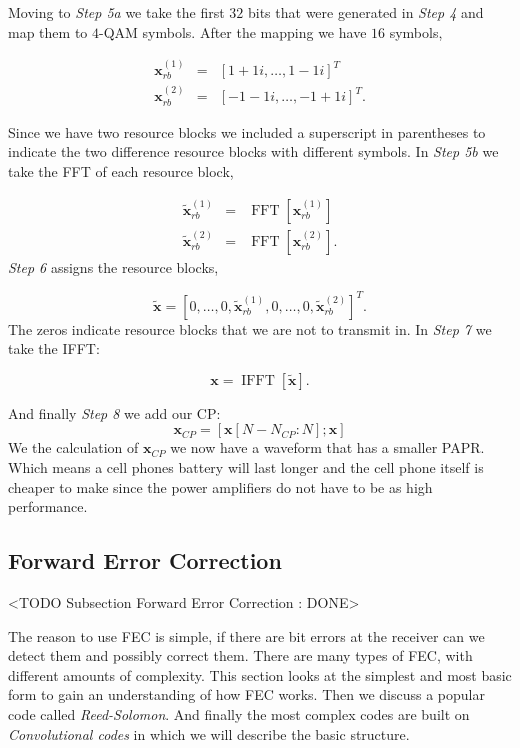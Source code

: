 Moving to \emph{Step 5a} we take the first $32$ bits that were generated in \emph{Step 4} and map them to $4$-\ac{QAM} symbols. After the mapping we have $16$ symbols,

\begin{eqnarray}
\mathbf{x}_{rb}^{(1)}&=&[1+1i,\dots,1-1i]^T\\
\mathbf{x}_{rb}^{(2)}&=&[-1-1i,\dots,-1+1i]^T.
\end{eqnarray}
\noindent

Since we have two resource blocks we included a superscript in parentheses to indicate the two difference resource blocks with different symbols. In \emph{Step 5b} we take the \ac{FFT} of each resource block,

\begin{eqnarray}
\tilde{\mathbf{x}}_{rb}^{(1)}&=&\operatorname{FFT}\left[\mathbf{x}_{rb}^{(1)}\right]\\
\tilde{\mathbf{x}}_{rb}^{(2)}&=&\operatorname{FFT}\left[\mathbf{x}_{rb}^{(2)}\right].
\end{eqnarray} 
\noindent
\emph{Step 6} assigns the resource blocks,

\begin{equation}
\tilde{\mathbf{x}}=[0,\dots,0,\tilde{\mathbf{x}}_{rb}^{(1)},0,\dots,0,\tilde{\mathbf{x}}_{rb}^{(2)}]^T.
\end{equation}
\noindent 
The zeros indicate resource blocks that we are not to transmit in. In \emph{Step 7} we take the \ac{IFFT}:

\begin{equation}
\mathbf{x}=\operatorname{IFFT}\left[\tilde{\mathbf{x}}\right].
\end{equation}
\noindent

And finally \emph{Step 8} we add our \ac{CP}:
\begin{equation}
\mathbf{x}_{CP}=[\mathbf{x}[N-N_{CP}:N]; \mathbf{x}]
\end{equation}
\noindent 
We the calculation of $\mathbf{x}_{CP}$ we now have a waveform that has a smaller \ac{PAPR}. Which means a cell phones battery will last longer and the cell phone itself is cheaper to make since the power amplifiers do not have to be as high performance. 
	
\subsection{Forward Error Correction}
	<TODO Subsection Forward Error Correction : DONE>

The reason to use \ac{FEC} is simple, if there are bit errors at the receiver can we detect them and possibly correct them. There are many types of \ac{FEC}, with different amounts of complexity. This section looks at the simplest and most basic form to gain an understanding of how \ac{FEC} works. Then we discuss a popular code called \emph{Reed-Solomon}. And finally the most complex codes are built on \emph{Convolutional codes} in which we will describe the basic structure. 
	
